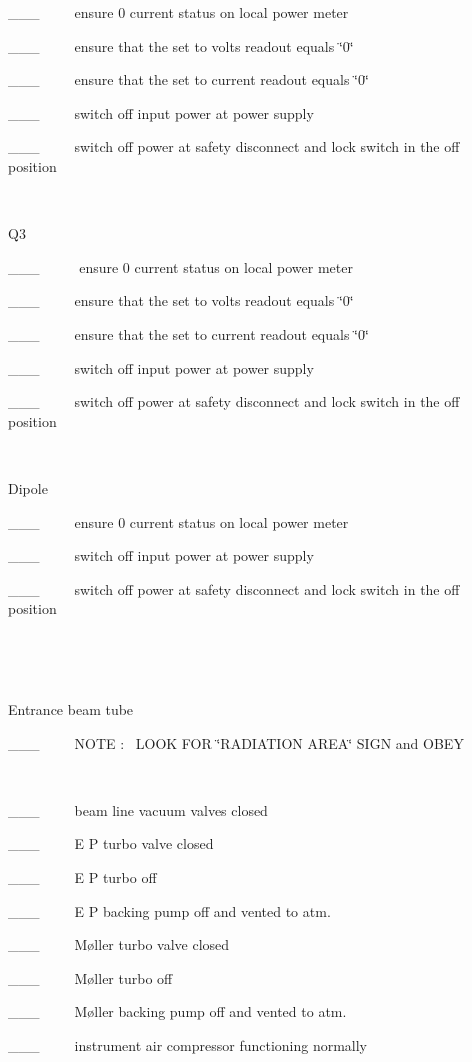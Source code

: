 \_\_\_~~~~~ensure 0 current status on local power meter 

\_\_\_~~~~~ensure that the set to volts readout equals \char`\"{}0\char`\"{}

\_\_\_~~~~~ensure that the set to current readout equals \char`\"{}0\char`\"{}

\_\_\_~~~~~switch off input power at power supply

\_\_\_~~~~~switch off power at safety disconnect and lock switch in the off
position

~

Q3

\_\_\_~~~~~ ensure 0 current status on local power meter 

\_\_\_~~~~~ensure that the set to volts readout equals \char`\"{}0\char`\"{}

\_\_\_~~~~~ensure that the set to current readout equals \char`\"{}0\char`\"{}

\_\_\_~~~~~switch off input power at power supply

\_\_\_~~~~~switch off power at safety disconnect and lock switch in the off
position

~

Dipole

\_\_\_~~~~~ensure 0 current status on local power meter 

\_\_\_~~~~~switch off input power at power supply

\_\_\_~~~~~switch off power at safety disconnect and lock switch in the off
position

~~

~

Entrance beam tube

\_\_\_~~~~~NOTE :~ LOOK FOR \char`\"{}RADIATION AREA\char`\"{} SIGN and OBEY

~

\_\_\_~~~~~beam line vacuum valves closed

\_\_\_~~~~~E P turbo valve closed

\_\_\_~~~~~E P turbo off 

\_\_\_~~~~~E P backing pump off and vented to atm.

\_\_\_~~~~~M{\o}ller turbo valve closed

\_\_\_~~~~~M{\o}ller turbo off 

\_\_\_~~~~~M{\o}ller backing pump off and vented to atm.

\_\_\_~~~~~instrument air compressor functioning normally

~

